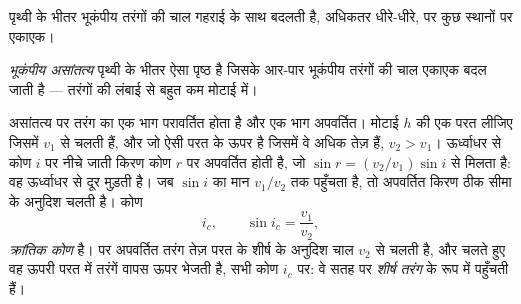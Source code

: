 पृथ्वी के भीतर भूकंपीय तरंगों की चाल गहराई के साथ बदलती है, अधिकतर
धीरे-धीरे, पर कुछ स्थानों पर एकाएक।

\begin{definition}[भूकंपीय असांतत्य]\label{def:g11:seismic-structure:discontinuity}
\emph{भूकंपीय असांतत्य} पृथ्वी के भीतर ऐसा पृष्ठ
है जिसके आर-पार भूकंपीय तरंगों की चाल एकाएक बदल जाती है ---
तरंगों की लंबाई से बहुत कम मोटाई में।
\end{definition}

असांतत्य पर तरंग का एक भाग परावर्तित होता है और एक भाग अपवर्तित। मोटाई $h$ की
एक परत लीजिए जिसमें  $v_1$ से चलती हैं, और जो ऐसी परत के ऊपर है
जिसमें वे अधिक तेज़ हैं, $v_2 > v_1$। ऊर्ध्वाधर से कोण $i$ पर नीचे जाती किरण
कोण $r$ पर अपवर्तित होती है, जो $\sin r = (v_2/v_1)\sin
i$ से मिलता है: वह ऊर्ध्वाधर से दूर मुड़ती है। जब $\sin i$ का मान $v_1/v_2$ तक पहुँचता है, तो
अपवर्तित किरण ठीक सीमा के अनुदिश चलती है। कोण
\[
  i_c, \qquad \sin i_c = \frac{v_1}{v_2},
\]
\emph{क्रांतिक कोण} है।  पर अपवर्तित
तरंग तेज़ परत के शीर्ष के अनुदिश चाल $v_2$ से चलती है,
और चलते हुए वह ऊपरी परत में तरंगें वापस ऊपर भेजती है, सभी कोण
$i_c$ पर: वे सतह पर \emph{शीर्ष तरंग} के रूप में पहुँचती हैं।

